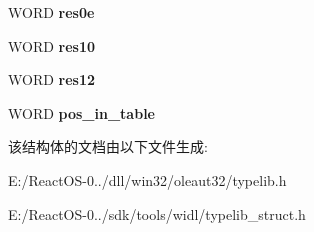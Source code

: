 \begin{DoxyCompactItemize}
W\+O\+RD {\bfseries res0e}
\item 
\mbox{\label{struct_s_l_t_g___impl_info_a3fe57c752bb52b305ee99ba9457798bb}} 
W\+O\+RD {\bfseries res10}
\item 
\mbox{\label{struct_s_l_t_g___impl_info_afc8fdda78033de521bb1b129aa389f8d}} 
W\+O\+RD {\bfseries res12}
\item 
\mbox{\label{struct_s_l_t_g___impl_info_ae25d25e2cc5e0e814ffc348fd87dc937}} 
W\+O\+RD {\bfseries pos\+\_\+in\+\_\+table}
\end{DoxyCompactItemize}


该结构体的文档由以下文件生成\+:\begin{DoxyCompactItemize}
\item 
E\+:/\+React\+O\+S-\/0../dll/win32/oleaut32/typelib.\+h\item 
E\+:/\+React\+O\+S-\/0../sdk/tools/widl/typelib\+\_\+struct.\+h\end{DoxyCompactItemize}
